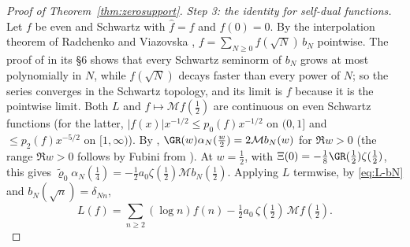 \begin{proof}[Proof of Theorem~\textup{\ref{thm:zerosupport}}]
\emph{Step 3: the identity for self-dual functions.} Let $f$ be even and Schwartz with $\hat f=f$ and $f(0)=0$. By the interpolation theorem
of Radchenko and Viazovska \cite[Theorem~1]{RV19}, $f=\sum_{N\ge0}f(\sqrt N)\,b_N$ pointwise. The proof of \cite[Theorem~2]{RV19} in its
\S6 shows that every Schwartz seminorm of $b_N$ grows at most polynomially in $N$, while $f(\sqrt N)$ decays faster than every power of $N$;
so the series converges in the Schwartz topology, and its limit is $f$ because it is the pointwise limit. Both $L$ and
$f\mapsto\mathcal Mf(\frac12)$ are continuous on even Schwartz functions (for the latter, $|f(x)|x^{-1/2}\le p_0(f)x^{-1/2}$ on $(0,1]$ and
$\le p_2(f)x^{-5/2}$ on $[1,\infty)$). By \cite[(3.17)]{BRS}, $\GR(w)\alpha_N(\frac w2)=2\mathcal Mb_N(w)$ for $\Re w>0$ (the range
$\Re w>0$ follows by Fubini from \cite[(3.12), (3.16)]{BRS}). At $w=\frac12$, with $\Xi(0)=-\frac18\GR(\frac12)\zeta(\frac12)$, this gives
$\tilde\varrho_0\alpha_N(\frac14)=-\frac12a_0\zeta(\frac12)\mathcal Mb_N(\frac12)$. Applying $L$ termwise, by \eqref{eq:L-bN} and
$b_N(\sqrt n)=\delta_{Nn}$,
\begin{equation}\label{eq:L-f}
L(f)=\sum_{n\ge2}(\log n)f(n)-\tfrac12a_0\,\zeta(\tfrac12)\,\mathcal Mf(\tfrac12).
\end{equation}


\end{proof}
